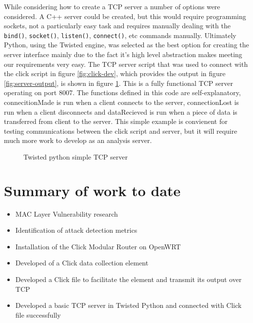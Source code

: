 While considering how to create a TCP server a number of options were considered. A C++ server could be created, but this would require programming sockets, not a particularly easy task and requires manually dealing with the \texttt{bind()}, \texttt{socket()}, \texttt{listen()}, \texttt{connect()}, etc commands manually. Ultimately Python, using the Twisted engine, was selected as the best option for creating the server interface mainly due to the fact it's high level abstraction makes meeting our requirements very easy. The TCP server script that was used to connect with the click script in figure \ref{fig:click-dev}, which provides the output in figure \ref{fig:server-output}, is shown in figure \ref{fig:twistd-tcp-server}. This is a fully functional TCP server operating on port 8007. The functions defined in this code are self-explanatory, connecitionMade is run when a client connects to the server, connectionLost is run when a client disconnects and dataRecieved is run when a piece of data is transferred from client to the server. This simple example is convienent for testing communications between the click script and server, but it will require much more work to develop as an analysis server.

\begin{figure}[H]
 \lstset{language=python}
 
\caption{Twisted python simple TCP server}
\label{fig:twistd-tcp-server}
\end{figure}

\section{Summary of work to date}
\begin{itemize}
 \item MAC Layer Vulnerability research
 \item Identification of attack detection metrics
 \item Installation of the Click Modular Router on OpenWRT
 \item Developed of a Click data collection element
 \item Developed a Click file to facilitate the element and transmit its output over TCP
 \item Developed a basic TCP server in Twisted Python and connected with Click file successfully
\end{itemize}

